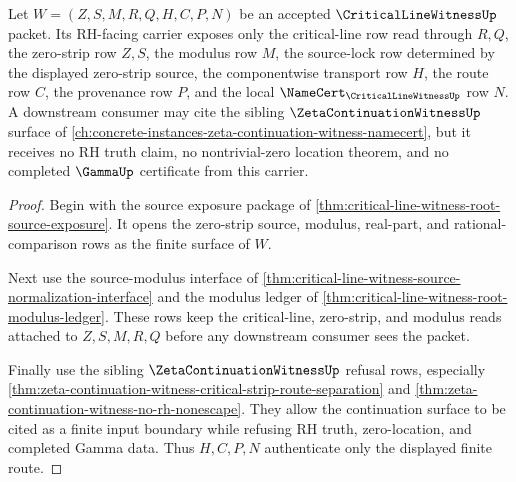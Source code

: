 \begin{theorem}
\label{thm:critical-line-witness-rh-interface-carrier}
Let $W=(Z,S,M,R,Q,H,C,P,N)$ be an accepted $\CriticalLineWitnessUp$ packet. Its RH-facing carrier exposes only the critical-line row read through $R,Q$, the zero-strip row $Z,S$, the modulus row $M$, the source-lock row determined by the displayed zero-strip source, the componentwise transport row $H$, the route row $C$, the provenance row $P$, and the local $\NameCert_{\CriticalLineWitnessUp}$ row $N$. A downstream consumer may cite the sibling $\ZetaContinuationWitnessUp$ surface of \autoref{ch:concrete-instances-zeta-continuation-witness-namecert}, but it receives no RH truth claim, no nontrivial-zero location theorem, and no completed $\GammaUp$ certificate from this carrier.
\end{theorem}
\begin{proof}
Begin with the source exposure package of \autoref{thm:critical-line-witness-root-source-exposure}. It opens the zero-strip source, modulus, real-part, and rational-comparison rows as the finite surface of $W$.

Next use the source-modulus interface of \autoref{thm:critical-line-witness-source-normalization-interface} and the modulus ledger of \autoref{thm:critical-line-witness-root-modulus-ledger}. These rows keep the critical-line, zero-strip, and modulus reads attached to $Z,S,M,R,Q$ before any downstream consumer sees the packet.

Finally use the sibling $\ZetaContinuationWitnessUp$ refusal rows, especially \autoref{thm:zeta-continuation-witness-critical-strip-route-separation} and \autoref{thm:zeta-continuation-witness-no-rh-nonescape}. They allow the continuation surface to be cited as a finite input boundary while refusing RH truth, zero-location, and completed Gamma data. Thus $H,C,P,N$ authenticate only the displayed finite route.
\end{proof}

